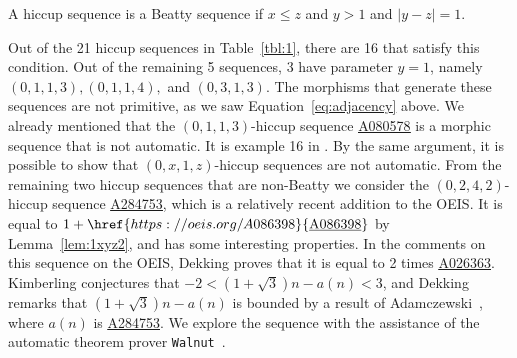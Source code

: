 \documentclass[12pt,reqno]{article}
\newcommand{\seqnum}[1]{\href{https://oeis.org/#1}{\rm \underline{#1}}}
\begin{document}
\begin{theorem}\label{thm:main3}
    A hiccup sequence is a Beatty sequence if $x\leq z$ and $y>1$ and $|y-z|=1$.
\end{theorem}

Out of the 21 hiccup sequences in Table~\ref{tbl:1}, there are 16
that satisfy this condition.
Out of the remaining 5 sequences, 3 have parameter $y=1$, namely
$(0,1,1,3), (0,1,1,4),$ and $(0,3,1,3)$. The morphisms that generate these
sequences are not primitive, as we saw Equation~\ref{eq:adjacency} above.
We already mentioned that the $(0,1,1,3)$-hiccup sequence \seqnum{A080578}
is a morphic sequence that is not automatic. It is example 16 in
\cite{allouche2022}. By the same argument, it is possible to show
that $(0,x,1,z)$-hiccup sequences are not automatic.
\medbreak
From the remaining two hiccup sequences that are non-Beatty
we consider the $(0,2,4,2)$-hiccup sequence \seqnum{A284753}, which
is a relatively recent addition to the OEIS. 
It is equal to $1+\seqnum{A086398}$ by Lemma~\ref{lem:1xyz2}, and has some interesting
properties. In the comments on this sequence on the OEIS, Dekking proves
that it is equal to 2 times \seqnum{A026363}. Kimberling conjectures
that $-2<(1+\sqrt 3)n-a(n)<3$, and Dekking remarks
that $(1+\sqrt 3)n-a(n)$ is bounded by a result
of Adamczewski~\cite{adamczewski2004}, where $a(n)$ is \seqnum{A284753}. We explore the sequence with the assistance of the automatic
theorem prover \texttt{Walnut}~\cite{mousavi, shallit2022}. 
\end{document}
